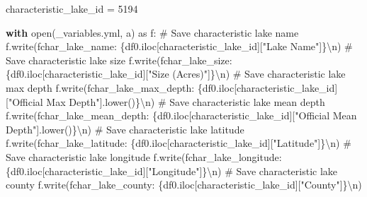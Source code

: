 \documentclass[
]{article}
\newenvironment{Shaded}{\begin{snugshade}}{\end{snugshade}}
\newcommand{\BuiltInTok}[1]{\textcolor[rgb]{0.00,0.23,0.31}{#1}}
\newcommand{\CharTok}[1]{\textcolor[rgb]{0.13,0.47,0.30}{#1}}
\newcommand{\CommentTok}[1]{\textcolor[rgb]{0.37,0.37,0.37}{#1}}
\newcommand{\ControlFlowTok}[1]{\textcolor[rgb]{0.00,0.23,0.31}{\textbf{#1}}}
\newcommand{\DecValTok}[1]{\textcolor[rgb]{0.68,0.00,0.00}{#1}}
\newcommand{\ImportTok}[1]{\textcolor[rgb]{0.00,0.46,0.62}{#1}}
\newcommand{\NormalTok}[1]{\textcolor[rgb]{0.00,0.23,0.31}{#1}}
\newcommand{\OperatorTok}[1]{\textcolor[rgb]{0.37,0.37,0.37}{#1}}
\newcommand{\SpecialCharTok}[1]{\textcolor[rgb]{0.37,0.37,0.37}{#1}}
\newcommand{\SpecialStringTok}[1]{\textcolor[rgb]{0.13,0.47,0.30}{#1}}
\newcommand{\StringTok}[1]{\textcolor[rgb]{0.13,0.47,0.30}{#1}}
\begin{document}
\begin{Shaded}
\begin{Highlighting}[]
\NormalTok{characteristic\_lake\_id }\OperatorTok{=} \DecValTok{5194}

\ControlFlowTok{with} \BuiltInTok{open}\NormalTok{(}\StringTok{\textquotesingle{}\_variables.yml\textquotesingle{}}\NormalTok{, }\StringTok{\textquotesingle{}a\textquotesingle{}}\NormalTok{) }\ImportTok{as}\NormalTok{ f:}
    \CommentTok{\# Save characteristic lake name}
\NormalTok{    f.write(}\SpecialStringTok{f\textquotesingle{}char\_lake\_name: }\SpecialCharTok{\{}\NormalTok{df0}\SpecialCharTok{.}\NormalTok{iloc[characteristic\_lake\_id][}\StringTok{"Lake Name"}\NormalTok{]}\SpecialCharTok{\}}\CharTok{\textbackslash{}n}\SpecialStringTok{\textquotesingle{}}\NormalTok{)}
    \CommentTok{\# Save characteristic lake size}
\NormalTok{    f.write(}\SpecialStringTok{f\textquotesingle{}char\_lake\_size: }\SpecialCharTok{\{}\NormalTok{df0}\SpecialCharTok{.}\NormalTok{iloc[characteristic\_lake\_id][}\StringTok{"Size (Acres)"}\NormalTok{]}\SpecialCharTok{\}}\CharTok{\textbackslash{}n}\SpecialStringTok{\textquotesingle{}}\NormalTok{)}
    \CommentTok{\# Save characteristic lake max depth}
\NormalTok{    f.write(}\SpecialStringTok{f\textquotesingle{}char\_lake\_max\_depth: }\SpecialCharTok{\{}\NormalTok{df0}\SpecialCharTok{.}\NormalTok{iloc[characteristic\_lake\_id][}\StringTok{"Official Max Depth"}\NormalTok{]}\SpecialCharTok{.}\NormalTok{lower()}\SpecialCharTok{\}}\CharTok{\textbackslash{}n}\SpecialStringTok{\textquotesingle{}}\NormalTok{)}
    \CommentTok{\# Save characteristic lake mean depth}
\NormalTok{    f.write(}\SpecialStringTok{f\textquotesingle{}char\_lake\_mean\_depth: }\SpecialCharTok{\{}\NormalTok{df0}\SpecialCharTok{.}\NormalTok{iloc[characteristic\_lake\_id][}\StringTok{"Official Mean Depth"}\NormalTok{]}\SpecialCharTok{.}\NormalTok{lower()}\SpecialCharTok{\}}\CharTok{\textbackslash{}n}\SpecialStringTok{\textquotesingle{}}\NormalTok{)}
    \CommentTok{\# Save characteristic lake latitude}
\NormalTok{    f.write(}\SpecialStringTok{f\textquotesingle{}char\_lake\_latitude: }\SpecialCharTok{\{}\NormalTok{df0}\SpecialCharTok{.}\NormalTok{iloc[characteristic\_lake\_id][}\StringTok{"Latitude"}\NormalTok{]}\SpecialCharTok{\}}\CharTok{\textbackslash{}n}\SpecialStringTok{\textquotesingle{}}\NormalTok{)}
    \CommentTok{\# Save characteristic lake longitude}
\NormalTok{    f.write(}\SpecialStringTok{f\textquotesingle{}char\_lake\_longitude: }\SpecialCharTok{\{}\NormalTok{df0}\SpecialCharTok{.}\NormalTok{iloc[characteristic\_lake\_id][}\StringTok{"Longitude"}\NormalTok{]}\SpecialCharTok{\}}\CharTok{\textbackslash{}n}\SpecialStringTok{\textquotesingle{}}\NormalTok{)}
    \CommentTok{\# Save characteristic lake county}
\NormalTok{    f.write(}\SpecialStringTok{f\textquotesingle{}char\_lake\_county: }\SpecialCharTok{\{}\NormalTok{df0}\SpecialCharTok{.}\NormalTok{iloc[characteristic\_lake\_id][}\StringTok{"County"}\NormalTok{]}\SpecialCharTok{\}}\CharTok{\textbackslash{}n}\SpecialStringTok{\textquotesingle{}}\NormalTok{)}
\end{Highlighting}
\end{Shaded}
\end{document}
